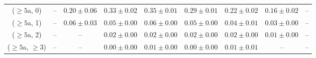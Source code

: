 \begin{table}[h!]
{\begin{tabular}{ccccccccc}
	($\ge5$a, 0) & -- & $0.20\pm 0.06$ & $0.33\pm 0.02$ & $0.35\pm 0.01$ & $0.29\pm 0.01$ & $0.22\pm 0.02$ & $0.16\pm 0.02$ & -- \\[0.5ex] 
	($\ge5$a, 1) & -- & $0.06\pm 0.03$ & $0.05\pm 0.00$ & $0.06\pm 0.00$ & $0.05\pm 0.00$ & $0.04\pm 0.01$ & $0.03\pm 0.00$ & -- \\[0.5ex] 
	($\ge5$a, 2) & -- & -- & $0.02\pm 0.00$ & $0.02\pm 0.00$ & $0.02\pm 0.00$ & $0.02\pm 0.00$ & $0.01\pm 0.00$ & -- \\[0.5ex] 
	($\ge5$a, $\ge3$) & -- & -- & $0.00\pm 0.00$ & $0.01\pm 0.00$ & $0.00\pm 0.00$ & $0.01\pm 0.01$ & -- & -- \\[0.5ex] 
	\hline
	\hline
\end{tabular}}
\end{table}
